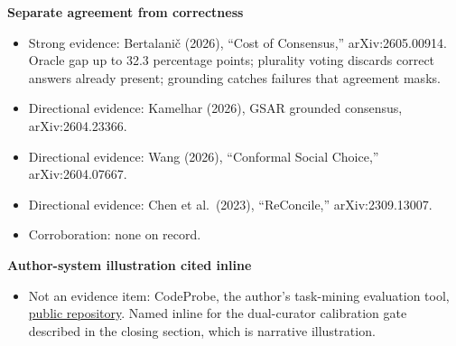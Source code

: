 \textbf{Separate agreement from correctness}

\begin{itemize}
\tightlist
\item
  Strong evidence: Bertalani\v{c} (2026), ``Cost of Consensus,'' arXiv:2605.00914. Oracle gap up to 32.3 percentage points; plurality voting discards correct answers already present; grounding catches failures that agreement masks.
\item
  Directional evidence: Kamelhar (2026), GSAR grounded consensus, arXiv:2604.23366.
\item
  Directional evidence: Wang (2026), ``Conformal Social Choice,'' arXiv:2604.07667.
\item
  Directional evidence: Chen et al.~(2023), ``ReConcile,'' arXiv:2309.13007.
\item
  Corroboration: none on record.
\end{itemize}

\textbf{Author-system illustration cited inline}

\begin{itemize}
\tightlist
\item
  Not an evidence item: CodeProbe, the author's task-mining evaluation tool, \href{https://github.com/sjarmak/codeprobe}{public repository}. Named inline for the dual-curator calibration gate described in the closing section, which is narrative illustration.
\end{itemize}
